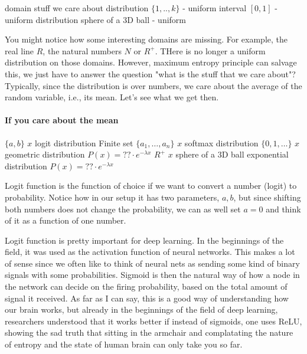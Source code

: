 \documentclass{article}
\begin{document}
domain          stuff we care about         distribution
$\{1, .., k\}$  -                           uniform
interval $[0,1]$        -                           uniform distribution
sphere of a 3D ball -                       uniform

You might notice how some interesting domains are missing. For example, the real line $R$, the natural numbers $N$ or $R^+$. THere is no longer a uniform distribution on those domains. However, maximum entropy principle can salvage this, we just have to answer the question "what is the stuff that we care about"? Typically, since the distribution is over numbers, we care about the average of the random variable, i.e., its mean. Let's see what we get then. 

\paragraph{If you care about the mean}

$\{a, b\}$           $x$                     logit distribution
Finite set $\{a_1, \dots, a_n\}$ $x$                     softmax distribution
$\{0, 1, \dots\}$   $x$                     geometric distribution $P(x) = ?? \cdot e^{-\lambda x}$
$R^+$               $x$   sphere of a 3D ball                  exponential distribution $P(x) = ?? \cdot e^{-\lambda x}$

Logit function is the function of choice if we want to convert a number (logit) to probability. Notice how in our setup it has two parameters, $a,b$, but since shifting both numbers does not change the probability, we can as well set $a=0$ and think of it as a function of one number. 


Logit function is pretty important for deep learning. In the beginnings of the field, it was used as the activation function of neural networks. This makes a lot of sense since we often like to think of neural nets as sending some kind of binary signals with some probabilities. Sigmoid is then the natural way of how a node in the network can decide on the firing probability, based on the total amount of signal it received. As far as I can say, this is a good way of understanding how our brain works, but already in the beginnings of the field of deep learning, researchers understood that it works better if instead of sigmoids, one uses ReLU, showing the sad truth that sitting in the armchair and complatating the nature of entropy and the state of human brain can only take you so far. 
\end{document}
